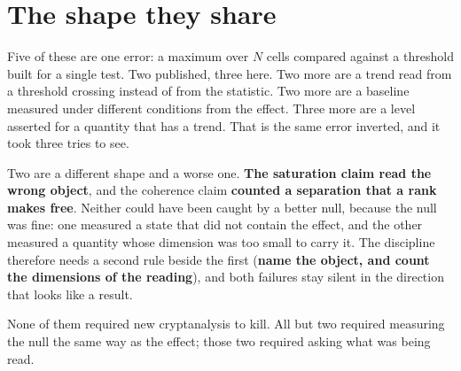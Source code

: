 \section{The shape they share}

Five of these are one error: a maximum over \(N\) cells compared against a threshold built for a single test. Two published, three here. Two more are a trend read from a threshold crossing instead of from the statistic. Two more are a baseline measured under different conditions from the effect. Three more are a level asserted for a quantity that has a trend. That is the same error inverted, and it took three tries to see.

Two are a different shape and a worse one. \textbf{The saturation claim read the wrong object}, and the coherence claim \textbf{counted a separation that a rank makes free}. Neither could have been caught by a better null, because the null was fine: one measured a state that did not contain the effect, and the other measured a quantity whose dimension was too small to carry it. The discipline therefore needs a second rule beside the first (\textbf{name the object, and count the dimensions of the reading}), and both failures stay silent in the direction that looks like a result.

None of them required new cryptanalysis to kill. All but two required measuring the null the same way as the effect; those two required asking what was being read.
